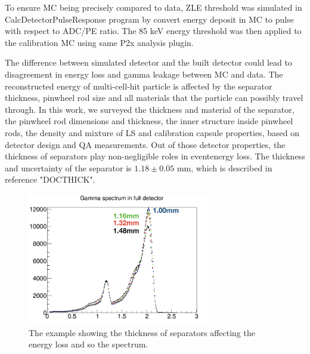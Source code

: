 To ensure MC being precisely compared to data, ZLE threshold was simulated in CalcDetectorPulseResponse program by convert energy deposit in MC to pulse with respect to ADC/PE ratio.
The 85 keV energy threshold was then applied to the calibration MC using same P2x analysis plugin.

The difference between simulated detector and the built detector could lead to disagreement in energy loss and gamma leakage between MC and data. 
The reconstructed energy of multi-cell-hit particle is affected by the separator thickness, pinwheel rod size and all materials that the particle can possibly travel through. 
In this work, we surveyed the thickness and material of the separator, the pinwheel rod dimensions and thickness, the inner structure inside pinwheel rods, the density and mixture of LS and calibration capsule properties, based on detector design and QA measurements.
Out of those detector properties, the thickness of separators play non-negligible roles in eventenergy loss. 
The thickness and uncertainty of the separator is $1.18 \pm 0.05$ mm, which is described in reference "DOCTHICK".

\begin{figure}[h!]
\centering
\includegraphics[width=80mm]{Figures/thickness.png}
\caption{The example showing the thickness of separators affecting the energy loss and so the spectrum.}
\label{fig:thickness}
\end{figure}

